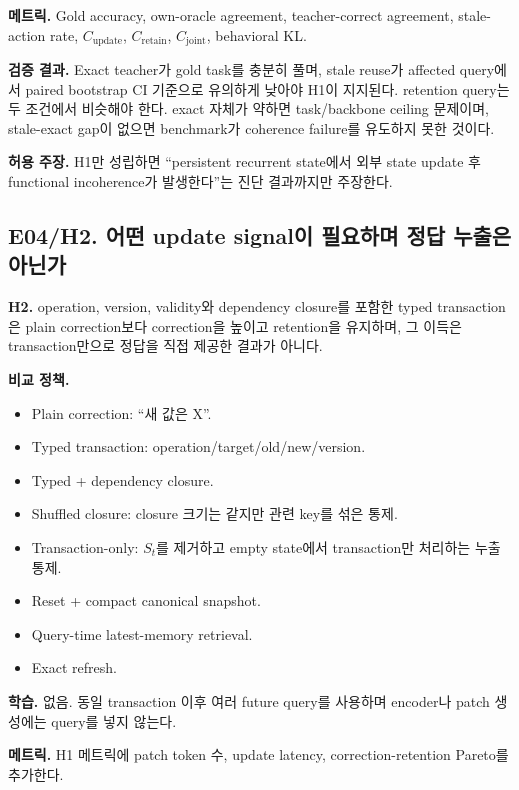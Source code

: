 \documentclass[10.5pt,a4paper]{article}
\begin{document}
\textbf{메트릭.} Gold accuracy, own-oracle agreement, teacher-correct agreement, stale-action rate, $C_{\mathrm{update}}$, $C_{\mathrm{retain}}$, $C_{\mathrm{joint}}$, behavioral KL.

\textbf{검증 결과.} Exact teacher가 gold task를 충분히 풀며, stale reuse가 affected query에서 paired bootstrap CI 기준으로 유의하게 낮아야 H1이 지지된다. retention query는 두 조건에서 비슷해야 한다. exact 자체가 약하면 task/backbone ceiling 문제이며, stale-exact gap이 없으면 benchmark가 coherence failure를 유도하지 못한 것이다.

\textbf{허용 주장.} H1만 성립하면 ``persistent recurrent state에서 외부 state update 후 functional incoherence가 발생한다''는 진단 결과까지만 주장한다.

\subsection{E04/H2. 어떤 update signal이 필요하며 정답 누출은 아닌가}

\begin{keybox}
\textbf{H2.} operation, version, validity와 dependency closure를 포함한 typed transaction은 plain correction보다 correction을 높이고 retention을 유지하며, 그 이득은 transaction만으로 정답을 직접 제공한 결과가 아니다.
\end{keybox}

\textbf{비교 정책.}
\begin{itemize}
\item Plain correction: ``새 값은 X''.
\item Typed transaction: operation/target/old/new/version.
\item Typed + dependency closure.
\item Shuffled closure: closure 크기는 같지만 관련 key를 섞은 통제.
\item Transaction-only: $S_t$를 제거하고 empty state에서 transaction만 처리하는 누출 통제.
\item Reset + compact canonical snapshot.
\item Query-time latest-memory retrieval.
\item Exact refresh.
\end{itemize}

\textbf{학습.} 없음. 동일 transaction 이후 여러 future query를 사용하며 encoder나 patch 생성에는 query를 넣지 않는다.

\textbf{메트릭.} H1 메트릭에 patch token 수, update latency, correction-retention Pareto를 추가한다.
\end{document}
